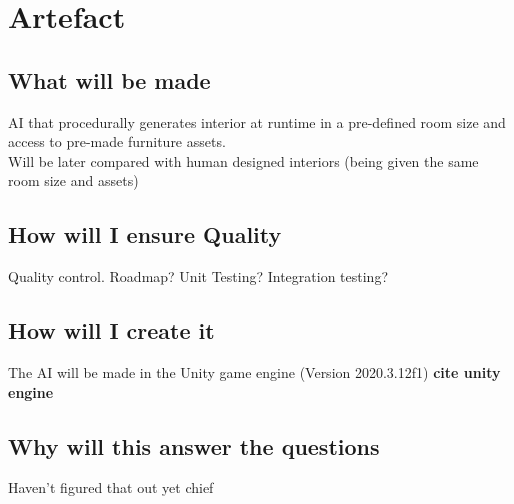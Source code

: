 \section{Artefact}

\subsection{What will be made}

AI that procedurally generates interior at runtime in a pre-defined room size and access to pre-made furniture assets.
\\
Will be later compared with human designed interiors (being given the same room size and assets)

\subsection{How will I ensure Quality}

Quality control. Roadmap? Unit Testing? Integration testing?

\subsection{How will I create it}

The AI will be made in the Unity game engine (Version 2020.3.12f1) \textbf{cite unity engine}

\subsection{Why will this answer the questions}

Haven't figured that out yet chief